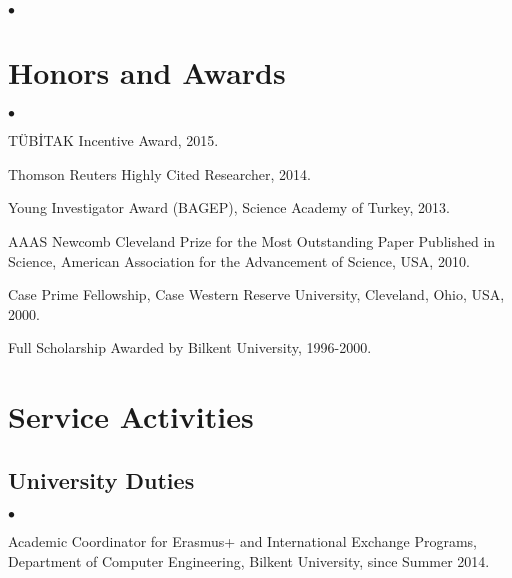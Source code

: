 \documentclass[margin,line]{res}
\newenvironment{list2}{
  \begin{list}{$\bullet$}{%
      \setlength{\itemsep}{0in}
      \setlength{\parsep}{0in} \setlength{\parskip}{0in}
      \setlength{\topsep}{0in} \setlength{\partopsep}{0in} 
      \setlength{\leftmargin}{0.2in}}}{\end{list}}
\newcommand{\junk}[1]{}
\begin{document}
\begin{resume}
\begin{list2}
\end{list2}



\vspace*{-.2cm}
\section{\sc Honors and Awards} 
\begin{list2}
\junk{
\item
  Ranked 36$^{th}$ among 1.2 million examinees in the Nationwide University
  Entrance Examinations in ~Turkey, 1996.
\item
  Ranked 40$^{th}$ in the Nationwide Post-Graduate Education Examination in Turkey, 1999.
}
\item
  TÜBİTAK Incentive Award, 2015.
\item
  Thomson Reuters Highly Cited Researcher, 2014.
\item
  Young Investigator Award (BAGEP), Science Academy of Turkey, 2013.
\item
  AAAS Newcomb Cleveland Prize for the Most Outstanding Paper Published in Science, American Association for the Advancement of Science, USA, 2010.
\item
  Case Prime Fellowship, Case Western Reserve University, Cleveland, Ohio, USA, 2000.
\item
  Full Scholarship Awarded by Bilkent University, 1996-2000.
\end{list2}

\vspace*{-.2cm}
\section{\sc Service Activities}
\vspace{-0.3cm}
\subsection{\small \sc University Duties}
\begin{list2}
\item
  Academic Coordinator for Erasmus+ and International Exchange Programs, Department of Computer Engineering, Bilkent University, since Summer 2014.
\end{list2}
\vspace{-0.3cm}


\end{resume}
\end{document}
